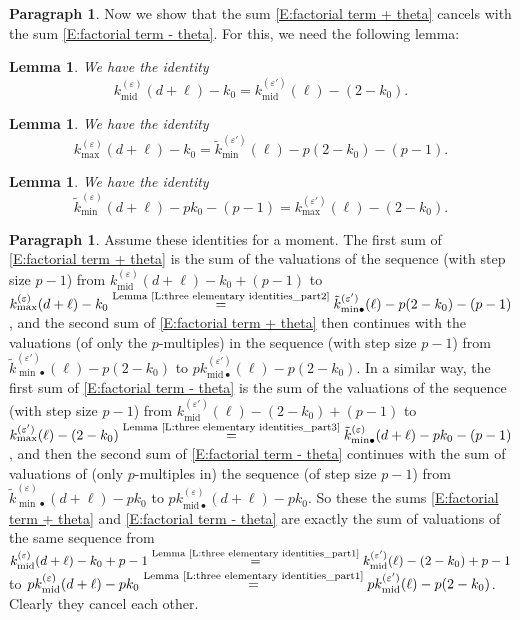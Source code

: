 \documentclass[12pt]{amsart}
\newtheorem{lemma}[subsection]{Lemma}
\theoremstyle{definition}
\newtheorem{para}[subsection]{Paragraph}
\numberwithin{equation}{subsection}
\newcommand{\midd}{\mathrm{mid}}
\begin{document}
\begin{para}
\label{P:para_145}
Now we show that the sum \eqref{E:factorial term + theta} cancels with the sum \eqref{E:factorial term - theta}.
For this, we need the following lemma:
\end{para}
\begin{lemma}\label{L:three elementary identities_part1}
We have the identity
$$k_\midd^{(\varepsilon)} (d+\ell) -k_0 = k_{\midd}^{(\varepsilon')}(\ell) - (2-k_0).$$
\end{lemma}

\begin{lemma}\label{L:three elementary identities_part2}
We have the identity
$$k_{\max}^{(\varepsilon)} (d+\ell) -k_0 = \tilde  k_{\min}^{(\varepsilon')}(\ell) -p (2-k_0)-(p-1).$$
\end{lemma}

\begin{lemma}\label{L:three elementary identities_part3}
We have the identity
$$\tilde k_{\min}^{(\varepsilon)} (d+\ell) -pk_0 - (p-1) =   k_{\max}^{(\varepsilon')}(\ell) - (2-k_0).$$
\end{lemma}
\begin{para}
\label{P:para_146}
Assume these identities for a moment.
The first sum of \eqref{E:factorial term + theta} is the sum of the  valuations of the sequence (with step size $p-1$) from $ k^{(\varepsilon)}_{\midd}(d+\ell) - k_0+(p-1)$ to $k^{(\varepsilon)}_{\max}(d+\ell) - k_0 \stackrel{\text{Lemma~\ref{L:three elementary identities_part2}}}{=} \tilde k_{{\min}\bullet}^{(\varepsilon')}(\ell) -p(2-k_0) - (p-1)$, and the second sum of \eqref{E:factorial term + theta} then continues with the valuations (of only the $p$-multiples) in the sequence (with step size $p-1$) from $\tilde k_{{\min}\bullet}^{(\varepsilon')}(\ell) -p(2-k_0)$ to $pk_{\midd\bullet}^{(\varepsilon')}(\ell) - p(2-k_0)$.
In a similar way, the first sum of \eqref{E:factorial term - theta} is the sum of the  valuations of the sequence (with step size $p-1$) from $ k^{(\varepsilon')}_{\midd}(\ell) - (2-k_0)+(p-1)$ to $k^{(\varepsilon')}_{\max}(\ell) - (2-k_0) \stackrel{\text{Lemma~\ref{L:three elementary identities_part3}}}{=} \tilde k_{{\min}\bullet}^{(\varepsilon)}(d+\ell) -pk_0-(p-1)$, and then the second sum of \eqref{E:factorial term - theta} continues with the sum of valuations of (only $p$-multiples in) the sequence (of step size $p-1$) from $\tilde k_{{\min}\bullet}^{(\varepsilon)}(d+\ell) -pk_0$ to $pk_{\midd\bullet}^{(\varepsilon)}(d+\ell) - pk_0$.
So these the sums \eqref{E:factorial term + theta} and \eqref{E:factorial term - theta} are exactly the sum of valuations of the same sequence from $k_{\midd}^{(\varepsilon)}(d+\ell) - k_0+p-1 \stackrel{\text{Lemma~\ref{L:three elementary identities_part1}}}{=} k_{\midd}^{(\varepsilon')}(\ell) - (2-k_0)+p-1$ to $pk_{\midd}^{(\varepsilon)}(d+\ell) - pk_0 \stackrel{\text{Lemma~\ref{L:three elementary identities_part1}}}{=} pk_{\midd}^{(\varepsilon')}(\ell) -p (2-k_0)$. Clearly they cancel each other.
\end{para}
\end{document}
